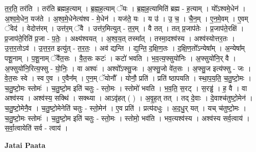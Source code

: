 \documentclass[17pt]{extarticle}
\begin{document}
त॒र॒ति॒ तर॑ति । तर॑ति ब्रह्मह॒त्याम् । ब्र॒ह्म॒ह॒त्याम् ॅयः । ब्र॒ह्म॒ह॒त्यामिति॑ ब्रह्म - ह॒त्याम् । यो᳚ऽश्वमे॒धेन॑ । अ॒श्व॒मे॒धेन॒ यज॑ते । अ॒श्व॒मे॒धेनेत्य॑श्व - मे॒धेन॑ । यज॑ते॒ यः । य उ॑ । उ॒ च॒ । चै॒न॒म् । ए॒न॒मे॒वम् । ए॒वम् ॅवेद॑ । वेदोत्त॑रम् । उत्त॑र॒म् ॅवै । उत्त॑र॒मित्युत् - त॒र॒म् । वै तत् । तत् प्र॒जाप॑तेः । प्र॒जाप॑ते॒रक्षि॑ । प्र॒जाप॑ते॒रिति॑ प्र॒जा - प॒तेः॒ । अक्ष्य॑श्वयत् । अ॒श्व॒य॒त् तस्मा᳚त् । तस्मा॒दश्व॑स्य । अश्व॑स्योत्तर॒तः । उ॒त्त॒र॒तोऽव॑ । उ॒त्त॒र॒त इत्यु॑त् - त॒र॒तः॒ । अव॑ द्यन्ति । द्य॒न्ति॒ द॒क्षि॒ण॒तः । द॒क्षि॒ण॒तो᳚ऽन्येषा᳚म् । अ॒न्येषा᳚म् पशू॒नाम् । प॒शू॒नाम् ॅवै॑त॒सः । वै॒त॒सः कटः॑ । कटो॑ भवति । भ॒व॒त्य॒फ्सुयो॑निः । अ॒फ्सुयो॑नि॒र् वै । अ॒फ्सुयो॑नि॒रित्य॒फ्सु - यो॒निः॒ । वा अश्वः॑ । अश्वो᳚ऽफ्सु॒जः । अ॒फ्सु॒जो वे॑त॒सः । अ॒फ्सु॒ज इत्य॑फ्सु - जः । वे॒त॒सः स्वे । स्व ए॒व । ए॒वैन᳚म् । ए॒न॒म् ॅयोनौ᳚ । योनौ॒ प्रति॑ । प्रति॑ ष्ठापयति । स्था॒प॒य॒ति॒ च॒तु॒ष्टो॒मः । च॒तु॒ष्टो॒मः स्तोमः॑ । च॒तु॒ष्टो॒म इति॑ चतुः - स्तो॒मः । स्तोमो॑ भवति । भ॒व॒ति॒ स॒रट् । स॒रड्ढ॑ । ह॒ वै । वा अश्व॑स्य । अश्व॑स्य॒ सक्थि॑ । सक्थ्या । आऽवृ॑हत् ( ) । अ॒वृ॒ह॒त् तत् । तद् दे॒वाः । दे॒वाश्च॑तुष्टो॒मेन॑ । च॒तु॒ष्टो॒मेनै॒व । च॒तु॒ष्टो॒मेनेति॑ चतुः - स्तो॒मेन॑ । ए॒व प्रति॑ । प्रत्य॑दधुः । अ॒द॒धु॒र् यत् । यच् च॑तुष्टो॒मः । च॒तु॒ष्टो॒मः स्तोमः॑ । च॒तु॒ष्टो॒म इति॑ चतुः - स्तो॒मः । स्तोमो॒ भव॑ति । भव॒त्यश्व॑स्य । अश्व॑स्य सर्व॒त्वाय॑ । स॒र्वा॒त्वायेति॑ सर्व - त्वाय॑ । \newline

\textbf{Jatai Paata} \newline
\end{document}
